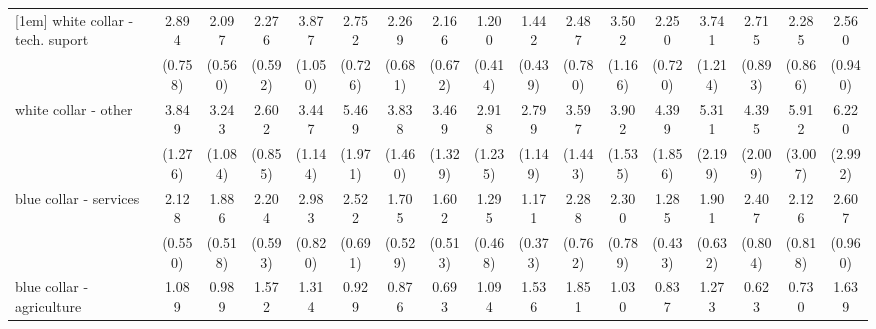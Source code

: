 {\begin{tabular}{l*{16}{c}}
[1em]
white collar - tech. suport&       2.894\sym{***}&       2.097\sym{**} &       2.276\sym{**} &       3.877\sym{***}&       2.752\sym{***}&       2.269\sym{**} &       2.166\sym{*}  &       1.200         &       1.442         &       2.487\sym{**} &       3.502\sym{***}&       2.250\sym{*}  &       3.741\sym{***}&       2.715\sym{**} &       2.285\sym{*}  &       2.560\sym{*}  \\
                    &     (0.758)         &     (0.560)         &     (0.592)         &     (1.050)         &     (0.726)         &     (0.681)         &     (0.672)         &     (0.414)         &     (0.439)         &     (0.780)         &     (1.166)         &     (0.720)         &     (1.214)         &     (0.893)         &     (0.866)         &     (0.940)         \\
[1em]
white collar - other&       3.849\sym{***}&       3.243\sym{***}&       2.602\sym{**} &       3.447\sym{***}&       5.469\sym{***}&       3.838\sym{***}&       3.469\sym{**} &       2.918\sym{*}  &       2.799\sym{*}  &       3.597\sym{**} &       3.902\sym{***}&       4.399\sym{***}&       5.311\sym{***}&       4.395\sym{**} &       5.912\sym{***}&       6.220\sym{***}\\
                    &     (1.276)         &     (1.084)         &     (0.855)         &     (1.144)         &     (1.971)         &     (1.460)         &     (1.329)         &     (1.235)         &     (1.149)         &     (1.443)         &     (1.535)         &     (1.856)         &     (2.199)         &     (2.009)         &     (3.007)         &     (2.992)         \\
[1em]
blue collar - services&       2.128\sym{**} &       1.886\sym{*}  &       2.204\sym{**} &       2.983\sym{***}&       2.522\sym{***}&       1.705         &       1.602         &       1.295         &       1.171         &       2.288\sym{*}  &       2.300\sym{*}  &       1.285         &       1.901         &       2.407\sym{**} &       2.126         &       2.607\sym{**} \\
                    &     (0.550)         &     (0.518)         &     (0.593)         &     (0.820)         &     (0.691)         &     (0.529)         &     (0.513)         &     (0.468)         &     (0.373)         &     (0.762)         &     (0.789)         &     (0.433)         &     (0.632)         &     (0.804)         &     (0.818)         &     (0.960)         \\
[1em]
blue collar - agriculture&       1.089         &       0.989         &       1.572         &       1.314         &       0.929         &       0.876         &       0.693         &       1.094         &       1.536         &       1.851         &       1.030         &       0.837         &       1.273         &       0.623         &       0.730         &       1.639         \\

\end{tabular}}
